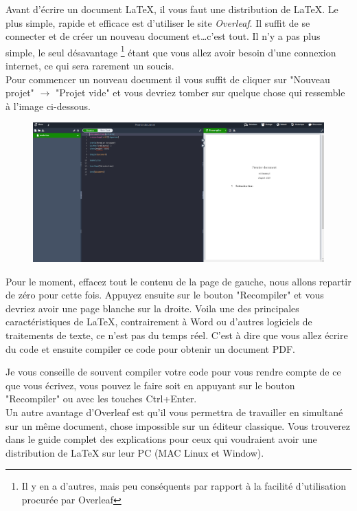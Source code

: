 \documentclass[11pt]{article}				%
\begin{document}
Avant d'écrire un document LaTeX, il vous faut une distribution de LaTeX. Le plus simple, rapide et efficace est d'utiliser le site \textit{Overleaf}. Il suffit de se connecter et de créer un nouveau document et\dots c'est tout. Il n'y a pas plus simple, le seul désavantage \footnote{Il y en a d'autres, mais peu conséquents par rapport à la facilité d'utilisation procurée par Overleaf} étant que vous allez avoir besoin d'une connexion internet, ce qui sera rarement un soucis.\\
Pour commencer un nouveau document il vous suffit de cliquer sur "Nouveau projet" $\longrightarrow$ "Projet vide" et vous devriez tomber sur quelque chose qui ressemble à l'image ci-dessous.\\
\begin{figure}[h!]
	\centering
	\includegraphics[scale=0.25]{ressources/overleaf_projet_vide.png}
\end{figure}	
\newline

Pour le moment, effacez tout le contenu de la page de gauche, nous  allons repartir de zéro pour cette fois. Appuyez ensuite sur le bouton "Recompiler" et vous devriez avoir une page blanche sur la droite.
Voila une des principales caractéristiques de LaTeX, contrairement à Word ou d'autres logiciels de traitements de texte, ce n'est pas du temps réel. C'est à dire que vous allez écrire du code et ensuite compiler ce code pour obtenir un document PDF. 

Je vous conseille de souvent compiler votre code pour vous rendre compte de ce que vous écrivez, vous pouvez le faire soit en appuyant sur le bouton "Recompiler" ou avec les touches Ctrl+Enter.\\



Un autre avantage d'Overleaf est qu'il vous permettra de travailler en simultané sur un même document, chose impossible sur un éditeur classique.
Vous trouverez dans le guide complet des explications pour ceux qui voudraient avoir une distribution de LaTeX sur leur PC (MAC Linux et Window).
\end{document}
